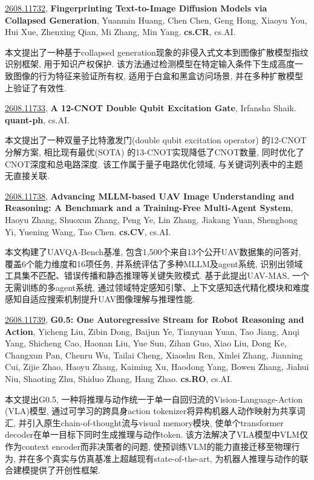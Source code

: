 \documentclass[9pt, a4paper]{article}
\theoremstyle{plain}
\theoremstyle{definition}
\theoremstyle{remark}
\newcommand{\arxivwithtarget}[3]{\hypertarget{#1}{}\href{https://arxiv.org/abs/#1}{#1}, \textbf{\textcolor{arxivblue}{#2}}, #3. }
\begin{document}
\arxivwithtarget{2608.11732}{Fingerprinting Text-to-Image Diffusion Models via Collapsed Generation}{Yuanmin Huang, Chen Chen, Geng Hong, Xiaoyu You, Hui Xue, Zhenxing Qian, Mi Zhang, Min Yang}\textbf{cs.CR}, cs.AI.

本文提出了一种基于collapsed generation现象的非侵入式文本到图像扩散模型指纹识别框架, 用于知识产权保护. 该方法通过检测模型在特定输入条件下生成高度一致图像的行为特征来验证所有权, 适用于白盒和黑盒访问场景, 并在多种扩散模型上验证了有效性.


\arxivwithtarget{2608.11733}{A 12-CNOT Double Qubit Excitation Gate}{Irfansha Shaik}\textbf{quant-ph}, cs.AI.

本文提出了一种双量子比特激发门(double qubit excitation operator) 的12-CNOT分解方案, 相比现有最优(SOTA) 的13-CNOT实现降低了CNOT数量, 同时优化了CNOT深度和总电路深度. 该工作属于量子电路优化领域, 与关键词列表中的主题无直接关联.


\arxivwithtarget{2608.11738}{Advancing MLLM-based UAV Image Understanding and Reasoning: A Benchmark and a Training-Free Multi-Agent System}{Haoyu Zhang, Shuoxun Zhang, Peng Ye, Lin Zhang, Jiakang Yuan, Shenghong Yi, Yuening Wang, Tao Chen}\textbf{cs.CV}, cs.AI.

本文构建了UAVQA-Bench基准, 包含1,500个来自13个公开UAV数据集的问答对, 覆盖6个能力维度和16项任务, 并系统评估了多种MLLM及agent系统, 识别出领域工具集不匹配、错误传播和静态推理等关键失败模式. 基于此提出UAV-MAS, 一个无需训练的多agent系统, 通过领域特定感知引擎、上下文感知迭代精化模块和难度感知自适应搜索机制提升UAV图像理解与推理性能.


\arxivwithtarget{2608.11739}{G0.5: One Autoregressive Stream for Robot Reasoning and Action}{Yicheng Liu, Zibin Dong, Baijun Ye, Tianyuan Yuan, Tao Jiang, Anqi Yang, Shicheng Cao, Haonan Liu, Yue Sun, Zihan Guo, Xiao Liu, Dong Ke, Changxun Pan, Chenru Wu, Tailai Cheng, Xiaoshu Ren, Xinlei Zhang, Jianning Cui, Zijie Zhao, Haoyu Zhang, Kaiming Xu, Haodong Yang, Bowen Zhang, Jiahui Niu, Shaoting Zhu, Shiduo Zhang, Hang Zhao}\textbf{cs.RO}, cs.AI.

本文提出G0.5, 一种将推理与动作统一于单一自回归流的Vision-Language-Action (VLA)模型, 通过可学习的跨具身action tokenizer将异构机器人动作映射为共享词汇, 并引入原生chain-of-thought流与visual memory模块, 使单个transformer decoder在单一目标下同时生成推理与动作token. 该方法解决了VLA模型中VLM仅作为context encoder而非决策者的问题, 使预训练VLM的能力直接迁移至物理行为, 并在多个真实与仿真基准上超越现有state-of-the-art, 为机器人推理与动作的联合建模提供了开创性框架.
\end{document}
